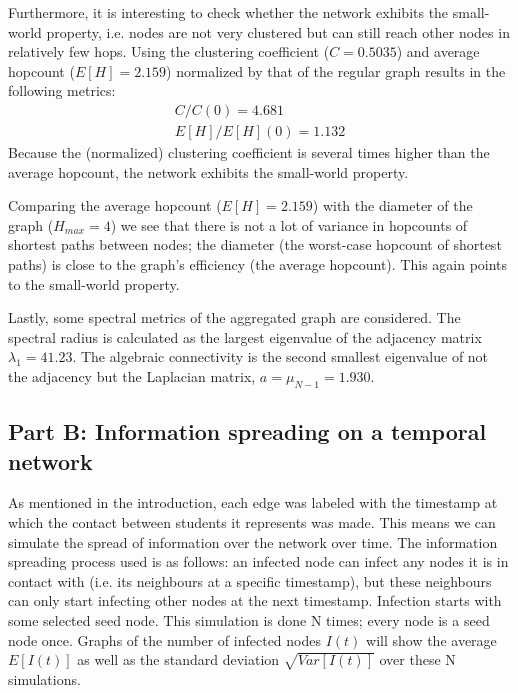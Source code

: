 \documentclass[letterpaper]{article}
\begin{document}
Furthermore, it is interesting to check whether the network exhibits the small-world property, i.e. nodes are not very clustered but can still reach other nodes in relatively few hops. Using the clustering coefficient (\(C=0.5035\)) and average hopcount (\(E[H]=2.159\)) normalized by that of the regular graph results in the following metrics: 
\begin{align*}
C/C(0) = 4.681\\
E[H]/E[H](0) = 1.132
\end{align*}
Because the (normalized) clustering coefficient is several times higher than the average hopcount, the network exhibits the small-world property. 


Comparing the average hopcount (\(E[H]=2.159\)) with the diameter of the graph (\(H_{max}=4\)) we see that there is not a lot of variance in hopcounts of shortest paths between nodes; the diameter (the worst-case hopcount of shortest paths) is close to the graph's efficiency (the average hopcount). This again points to the small-world property.

Lastly, some spectral metrics of the aggregated graph are considered. The spectral radius is calculated as the largest eigenvalue of the adjacency matrix \(\lambda_1=41.23\). The algebraic connectivity is the second smallest eigenvalue of not the adjacency but the Laplacian matrix, \(a=\mu_{N-1}=1.930\). 


\subsection*{Part B: Information spreading on a temporal network}

As mentioned in the introduction, each edge was labeled with the timestamp at which the contact between students it represents was made. This means we can simulate the spread of information over the network over time. The information spreading process used is as follows: an infected node can infect any nodes it is in contact with (i.e. its neighbours at a specific timestamp), but these neighbours can only start infecting other nodes at the next timestamp. Infection starts with some selected seed node. This simulation is done N times; every node is a seed node once. Graphs of the number of infected nodes \(I(t)\) will show the average \(E[I(t)]\) as well as the standard deviation \(\sqrt{Var[I(t)]}\) over these N simulations.
\end{document}
